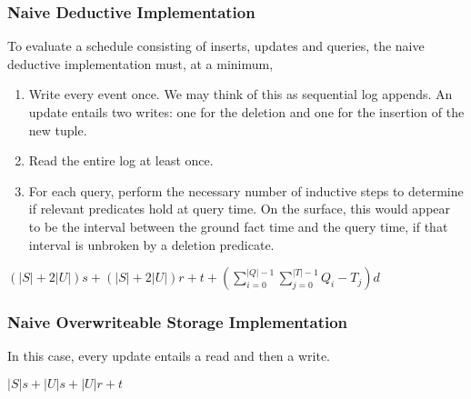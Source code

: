 \subsubsection{Naive Deductive Implementation}

To evaluate a schedule consisting of inserts, updates and queries, the naive deductive implementation must,
at a minimum,
\begin{enumerate}
\item Write every event once.  We may think of this as sequential log appends.  An update entails two writes: one for the deletion
and one for the insertion of the new tuple.
\item Read the entire log at least once.
\item For each query, perform the necessary number of inductive steps to determine if relevant predicates hold at query time.
On the surface, this would appear to be the interval between the ground fact time and the query time, if that interval is unbroken
by a deletion predicate.
\end{enumerate}

$(|S|+2|U|)s + (|S|+2|U|)r + t + (\displaystyle\sum_{i=0}^{|Q|-1} \displaystyle\sum_{j=0}^{|T|-1} Q_{i} - T_{j})d$

\subsubsection{Naive Overwriteable Storage Implementation}

In this case, every update entails a read and then a write.

$|S|s + |U|s + |U|r + t$


